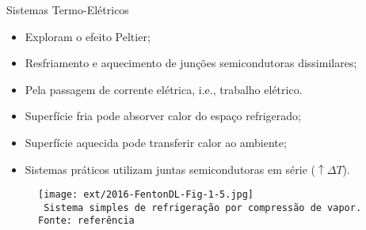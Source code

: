    \begin{frame}{Sistemas Termo-Elétricos}\vspace*{-0em}
        \begin{itemize}
            \item<1-> Exploram o \alert{efeito Peltier};
                \\[\medskipamount]
            \item<2-> Resfriamento e aquecimento de junções \alert{semicondutoras} dissimilares;
                \\[\medskipamount]
            \item<3-> Pela passagem de corrente elétrica, i.e., \alert{trabalho elétrico}.
                \\[\medskipamount]
            \item<4-> Superfície fria pode \alert{absorver calor} do espaço refrigerado;
                \\[\medskipamount]
            \item<5-> Superfície aquecida pode \alert{transferir calor} ao ambiente;
                \\[\medskipamount]
            \item<6-> Sistemas \alert{práticos} utilizam juntas semicondutoras em série
                ($\uparrow\Delta{T}$).
        \end{itemize}
    \end{frame}
    \begin{frame}\vspace*{-0em}
        \begin{center}
            \begin{figure}
                \fontsize{5.0}{5}\selectfont
                \texttt{[image: ext/2016-FentonDL-Fig-1-5.jpg]}
                \\\vspace*{-0.0em}\texttt{%
                    Sistema simples de refrigeração por compressão de vapor.\\
                    Fonte: referência~\cite{2016-FentonDL-ASHRAE}
                }
            \end{figure}
        \end{center}
    \end{frame}

